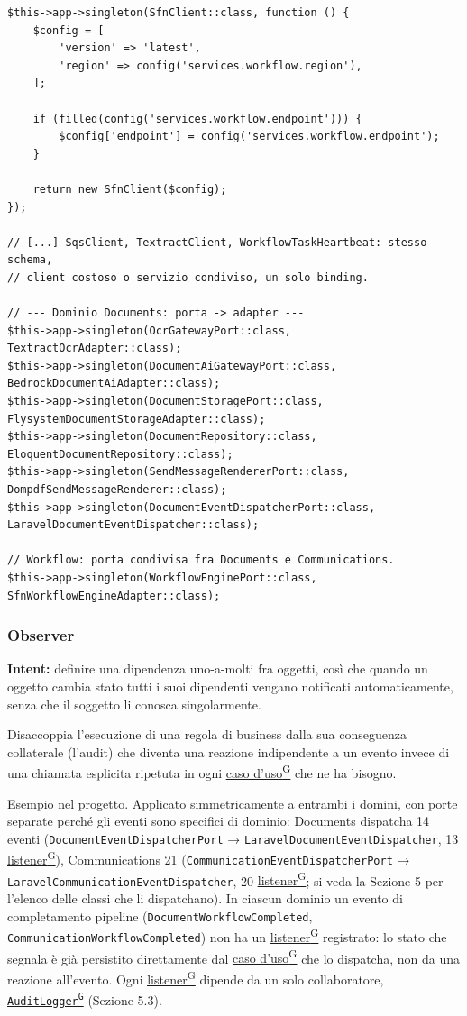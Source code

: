 \documentclass[a4paper,12pt]{article}
\providecommand{\glslink}[2]{\href{https://alittlebyte-19.github.io/Documentazione/glossario.html\#gls-#1}{\underline{#2}\textsuperscript{\scriptsize G}}}
\begin{document}
\begin{sloppypar}
\begin{lstlisting}[style=phplisting, caption={AppServiceProvider: binding singleton dei client AWS e delle porte secondarie}]
$this->app->singleton(SfnClient::class, function () {
    $config = [
        'version' => 'latest',
        'region' => config('services.workflow.region'),
    ];

    if (filled(config('services.workflow.endpoint'))) {
        $config['endpoint'] = config('services.workflow.endpoint');
    }

    return new SfnClient($config);
});

// [...] SqsClient, TextractClient, WorkflowTaskHeartbeat: stesso schema,
// client costoso o servizio condiviso, un solo binding.

// --- Dominio Documents: porta -> adapter ---
$this->app->singleton(OcrGatewayPort::class, TextractOcrAdapter::class);
$this->app->singleton(DocumentAiGatewayPort::class, BedrockDocumentAiAdapter::class);
$this->app->singleton(DocumentStoragePort::class, FlysystemDocumentStorageAdapter::class);
$this->app->singleton(DocumentRepository::class, EloquentDocumentRepository::class);
$this->app->singleton(SendMessageRendererPort::class, DompdfSendMessageRenderer::class);
$this->app->singleton(DocumentEventDispatcherPort::class, LaravelDocumentEventDispatcher::class);

// Workflow: porta condivisa fra Documents e Communications.
$this->app->singleton(WorkflowEnginePort::class, SfnWorkflowEngineAdapter::class);
\end{lstlisting}

\subsubsection{Observer}

\textbf{Intent:} definire una dipendenza uno-a-molti fra oggetti, così che quando un oggetto cambia stato tutti i suoi dipendenti vengano notificati automaticamente, senza che il soggetto li conosca singolarmente.

Disaccoppia l'esecuzione di una regola di business dalla sua conseguenza collaterale (l'audit) che diventa una reazione indipendente a un evento invece di una chiamata esplicita ripetuta in ogni \glslink{caso-d-uso-uc}{caso d'uso} che ne ha bisogno.

Esempio nel progetto. Applicato simmetricamente a entrambi i domini, con porte separate perché gli eventi sono specifici di dominio: Documents dispatcha 14 eventi (\texttt{DocumentEventDispatcherPort} → \texttt{LaravelDocumentEventDispatcher}, 13 \glslink{listener}{listener}), Communications 21 (\texttt{CommunicationEventDispatcherPort} → \texttt{LaravelCommunicationEventDispatcher}, 20 \glslink{listener}{listener}; si veda la Sezione 5 per l'elenco delle classi che li dispatchano). In ciascun dominio un evento di completamento pipeline (\texttt{DocumentWorkflowCompleted}, \texttt{CommunicationWorkflowCompleted}) non ha un \glslink{listener}{listener} registrato: lo stato che segnala è già persistito direttamente dal \glslink{caso-d-uso-uc}{caso d'uso} che lo dispatcha, non da una reazione all'evento. Ogni \glslink{listener}{listener} dipende da un solo collaboratore, \texttt{\glslink{auditlogger}{AuditLogger}} (Sezione 5.3).


\end{sloppypar}
\end{document}
